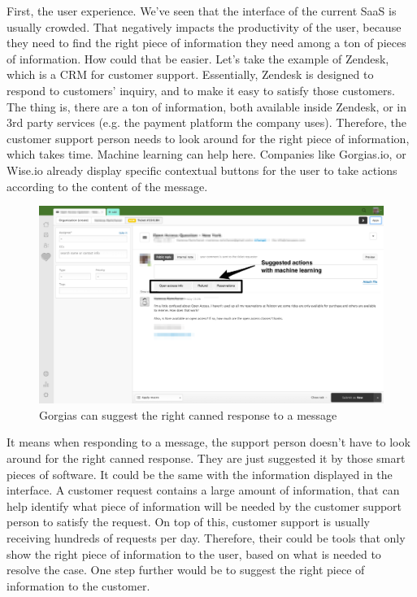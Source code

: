 \documentclass[12pt]{article}
\begin{document}
First, the user experience. We've seen that the interface of the current SaaS is
usually crowded. That negatively impacts the productivity of the user, because
they need to find the right piece of information they need among a ton of pieces
of information. How could that be easier. Let's take the example of Zendesk,
which is a CRM for customer support. Essentially, Zendesk is designed to respond
to customers' inquiry, and to make it easy to satisfy those customers. The thing
is, there are a ton of information, both available inside Zendesk, or in 3rd
party services (e.g. the payment platform the company uses). Therefore, the
customer support person needs to look around for the right piece of information,
which takes time. Machine learning can help here. Companies like Gorgias.io, or
Wise.io already display specific contextual buttons for the user to take actions
according to the content of the message.

\smallskip

\begin{figure}[ht]
    \centering
    \includegraphics[width=\textwidth]{zendesk}
    \caption{Gorgias can suggest the right canned response to a message}
    \label{fig:gorgias}
\end{figure}


\smallskip

It means when responding to a message, the support person doesn't have to look
around for the right canned response. They are just suggested it by those smart
pieces of software. It could be the same with the information displayed in the
interface. A customer request contains a large amount of information, that can
help identify what piece of information will be needed by the customer support
person to satisfy the request. On top of this, customer support is usually
receiving hundreds of requests per day. Therefore, their could be tools that
only show the right piece of information to the user, based on what is needed to
resolve the case. One step further would be to suggest the right piece of
information to the customer.
\end{document}
